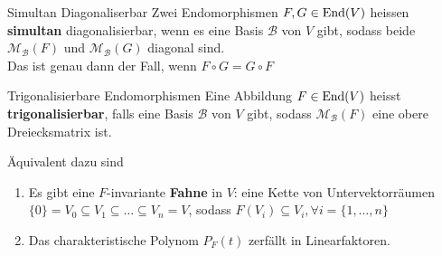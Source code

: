 

\begin{definition}{Simultan Diagonaliserbar}
    Zwei Endomorphismen $F,G \in \operatorname{End}(V)$ heissen \textbf{simultan} diagonalisierbar, wenn es eine Basis $\mathcal{B}$ von $V$ gibt, sodass beide $\mathcal{M}_{\mathcal{B}}(F)$ und $\mathcal{M}_{\mathcal{B}}(G)$ diagonal sind.\\
    Das ist genau dann der Fall, wenn $F \circ G = G \circ F$
\end{definition}


\begin{definition}{Trigonalisierbare Endomorphismen}
    Eine Abbildung $F \in \operatorname{End}(V)$ heisst \textbf{trigonalisierbar}, falls eine Basis $\mathcal{B}$ von $V$ gibt, sodass $\mathcal{M}_{\mathcal{B}}(F)$ eine obere Dreiecksmatrix ist.
\end{definition}
Äquivalent dazu sind
\begin{enumerate}
    \item	Es gibt eine $F$-invariante \textbf{Fahne} in $V$: eine Kette von Untervektorräumen $\{0\} = V_0 \subseteq V_1 \subseteq \ldots \subseteq V_n = V$, sodass $F(V_i) \subseteq V_i, \forall i = \{1, \ldots, n\}$
    \item   Das charakteristische Polynom $P_F(t)$ zerfällt in Linearfaktoren.
\end{enumerate}


